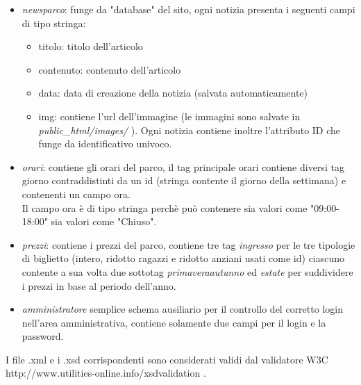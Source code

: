 \documentclass[12pt]{article}
\begin{document}
		\begin{itemize}
		\item \textit{newsparco}: funge da "database" del sito, ogni notizia presenta i seguenti campi di tipo stringa:
		\begin{itemize}
		\item titolo: titolo dell'articolo
		\item contenuto: contenuto dell'articolo
		\item data: data di creazione della notizia (salvata automaticamente)
		\item img: contiene l'url dell'immagine (le immagini sono salvate in \textit{public\_html/images/} ).
		Ogni notizia contiene inoltre l'attributo ID che funge da identificativo univoco.
		\end{itemize}
		\item \textit{orari}: contiene gli orari del parco, il tag principale orari contiene diversi tag giorno contraddistinti da un id (stringa contente il giorno della settimana) e contenenti un campo ora.\\
		Il campo ora \`e di tipo stringa perch\`e pu\`o contenere sia valori come "09:00-18:00" sia valori come "Chiuso".
		\item \textit{prezzi}: contiene i prezzi del parco, contiene tre tag \textit{ingresso} per le tre tipologie di biglietto (intero, ridotto ragazzi e ridotto anziani usati come id) ciascuno contente a sua volta due sottotag \textit{primaveraautunno} ed \textit{estate} per suddividere i prezzi in base al periodo dell'anno.
		\item  \textit{amministratore} semplice schema ausiliario per il controllo del corretto login nell'area amministrativa, contiene solamente due campi per il login e la password.
		\end{itemize}	
		I file .xml e i .xsd corrispondenti sono considerati validi dal validatore W3C http://www.utilities-online.info/xsdvalidation .			
					\newpage
\end{document}
